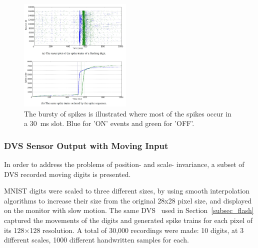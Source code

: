 \documentclass{frontiersENG} %
\begin{document}
\begin{figure}[b!]
	\centering
	\includegraphics[width=0.48\textwidth]{fig5}	
	\caption{The bursty of spikes is illustrated where most of the spikes occur in a 30~ms slot. Blue for 'ON' events and green for 'OFF'.}
	\label{fig:flash}
\end{figure}

\subsubsection{DVS Sensor Output with Moving Input}
In order to address the problems of position- and scale- invariance, a subset of DVS recorded moving digits is presented.

MNIST digits were scaled to three different sizes, by using smooth interpolation algorithms to increase their size from the original 28x28 pixel size, and displayed on the monitor with slow motion. 
The same DVS~\citep{serrano2013128} used in Section~\ref{subsec_flash} captured the movements of the digits and generated spike trains for each pixel of its 128$\times$128 resolution.
A total of 30,000 recordings were made: 10 digits, at 3 different scales, 1000 different handwritten samples for each.
\end{document}
